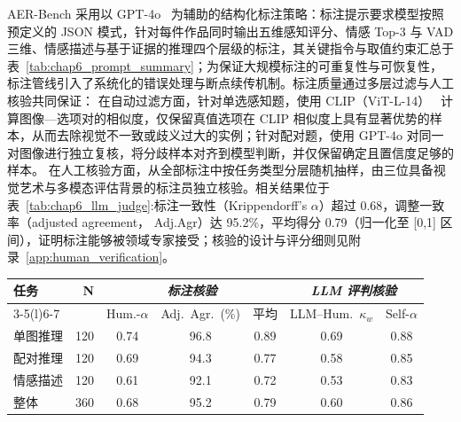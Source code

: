 AER-Bench 采用以 GPT-4o~\cite{achiam2023gpt} 为辅助的结构化标注策略：标注提示要求模型按照预定义的 JSON 模式，针对每件作品同时输出五维感知评分、情感 Top-3 与 VAD 三维、情感描述与基于证据的推理四个层级的标注，其关键指令与取值约束汇总于表~\ref{tab:chap6_prompt_summary}；为保证大规模标注的可重复性与可恢复性，标注管线引入了系统化的错误处理与断点续传机制。标注质量通过多层过滤与人工核验共同保证：
在自动过滤方面，针对单选感知题，使用 CLIP（ViT-L-14）~\cite{radford2021learning} 计算图像—选项对的相似度，仅保留真值选项在 CLIP 相似度上具有显著优势的样本，从而去除视觉不一致或歧义过大的实例；针对配对题，使用 GPT-4o 对同一对图像进行独立复核，将分歧样本对齐到模型判断，并仅保留确定且置信度足够的样本。
在人工核验方面，从全部标注中按任务类型分层随机抽样，由三位具备视觉艺术与多模态评估背景的标注员独立核验。相关结果位于表~\ref{tab:chap6_llm_judge}:标注一致性（Krippendorff's $\alpha$）超过 0.68，调整一致率（adjusted agreement， Adj.Agr）达 95.2\%，平均得分 0.79（归一化至 [0,1] 区间），证明标注能够被领域专家接受；核验的设计与评分细则见附录~\ref{app:human_verification}。


\begin{table}[!htbp]
    \vspace{0.5em}\centering\wuhao
    \setlength{\tabcolsep}{4pt}
    \begin{tabular}{lrccccc}
    \toprule
    \multirow{2}{*}{任务} & \multirow{2}{*}{N} &
    \multicolumn{3}{c}{\textit{标注核验}} &
    \multicolumn{2}{c}{\textit{LLM 评判核验}} \\
    \cmidrule(lr){3-5}\cmidrule(l){6-7}
     & &
    Hum.-$\alpha$ & Adj.\ Agr.\ (\%) & 平均 & LLM--Hum.\ $\kappa_w$ & Self-$\alpha$ \\
    \midrule
    单图推理 & 120 & 0.74 & 96.8 & 0.89 & 0.69 & 0.88 \\
    配对推理 & 120 & 0.69 & 94.3 & 0.77 & 0.58 & 0.85 \\
    情感描述 & 120 & 0.61 & 92.1 & 0.72 & 0.53 & 0.83 \\
    \midrule
    整体 & 360 & 0.68 & 95.2 & 0.79 & 0.60 & 0.86 \\
    \bottomrule
    \end{tabular}
\end{table}

